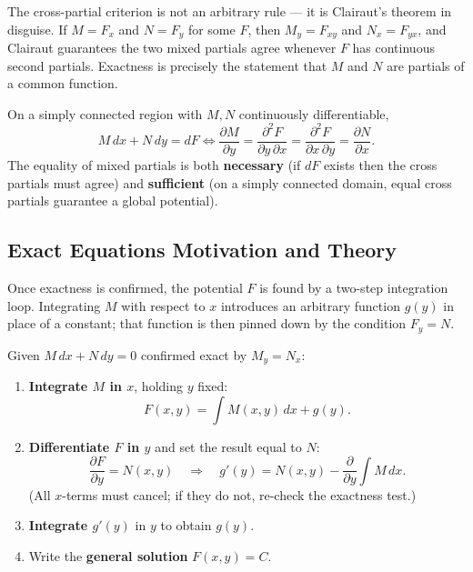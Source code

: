 The cross-partial criterion is not an arbitrary rule --- it is Clairaut's
theorem in disguise. If $M = F_x$ and $N = F_y$ for some $F$, then
$M_y = F_{xy}$ and $N_x = F_{yx}$, and Clairaut guarantees the two mixed
partials agree whenever $F$ has continuous second partials. Exactness is
precisely the statement that $M$ and $N$ are partials of a common function.

\begin{formulabox}
On a simply connected region with $M,N$ continuously differentiable,
\[
  M\,dx + N\,dy = dF
  \iff
  \frac{\partial M}{\partial y}
  = \frac{\partial^{2}F}{\partial y\,\partial x}
  = \frac{\partial^{2}F}{\partial x\,\partial y}
  = \frac{\partial N}{\partial x}.
\]
The equality of mixed partials is both \textbf{necessary} (if $dF$ exists then
the cross partials must agree) and \textbf{sufficient} (on a simply connected
domain, equal cross partials guarantee a global potential).
\end{formulabox}

\subsection{Exact Equations Motivation and Theory}

Once exactness is confirmed, the potential $F$ is found by a two-step
integration loop. Integrating $M$ with respect to $x$ introduces an arbitrary
function $g(y)$ in place of a constant; that function is then pinned down by
the condition $F_y = N$.

\begin{methodbox}
Given $M\,dx + N\,dy = 0$ confirmed exact by $M_y = N_x$:
\begin{enumerate}[leftmargin=1.6em, itemsep=3pt]
    \item \textbf{Integrate $M$ in $x$}, holding $y$ fixed:
          \[
            F(x,y) = \int M(x,y)\,dx + g(y).
          \]
    \item \textbf{Differentiate $F$ in $y$} and set the result equal to $N$:
          \[
            \frac{\partial F}{\partial y} = N(x,y)
            \quad\Longrightarrow\quad
            g'(y) = N(x,y) - \frac{\partial}{\partial y}\int M\,dx.
          \]
          (All $x$-terms must cancel; if they do not, re-check the exactness
          test.)
    \item \textbf{Integrate $g'(y)$} in $y$ to obtain $g(y)$.
    \item Write the \textbf{general solution} $F(x,y) = C$.
\end{enumerate}
\end{methodbox}

